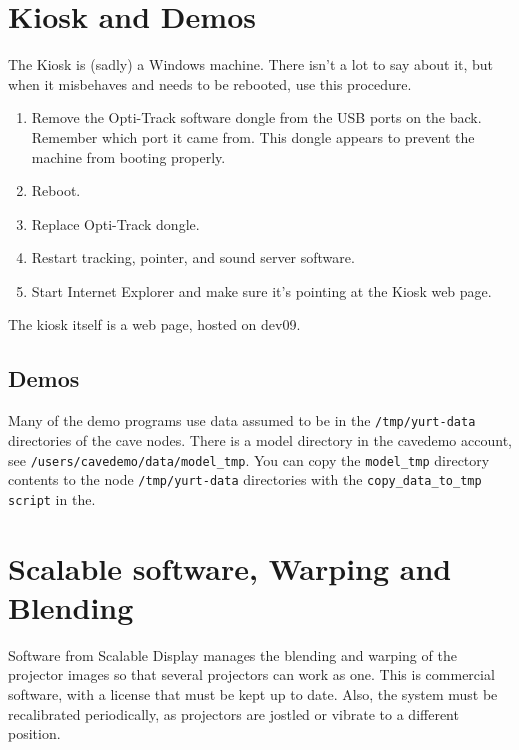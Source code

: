 \documentclass[11pt]{article}
\newcommand{\cmd}[1]{\texttt{#1}}
\begin{document}
\section{Kiosk and Demos}

The Kiosk is (sadly) a Windows machine.  There isn't a lot to say
about it, but when it misbehaves and needs to be rebooted, use this
procedure.

\begin{enumerate}
\item Remove the Opti-Track software dongle from the USB ports on the
  back.  Remember which port it came from.  This dongle appears to
  prevent the machine from booting properly.

\item Reboot.

\item Replace Opti-Track dongle.

\item Restart tracking, pointer, and sound server software.

\item Start Internet Explorer and make sure it's pointing at the Kiosk
  web page.

\end{enumerate}

The kiosk itself is a web page, hosted on dev09.

\subsection{Demos}
\label{Demos}

Many of the demo programs use data assumed to be in the
\cmd{/tmp/yurt-data} directories of the cave nodes.  There is a
model directory in the cavedemo account, see
\cmd{/users/cavedemo/data/model\_tmp}.  You can copy the
\cmd{model\_tmp} directory contents to the node
\cmd{/tmp/yurt-data} directories with the
\cmd{copy\_data\_to\_tmp script} in the.


\section{Scalable software, Warping and Blending}

Software from Scalable Display manages the blending and warping of the
projector images so that several projectors can work as one.  This is
commercial software, with a license that must be kept up to date.
Also, the system must be recalibrated periodically, as projectors are
jostled or vibrate to a different position.
\end{document}

